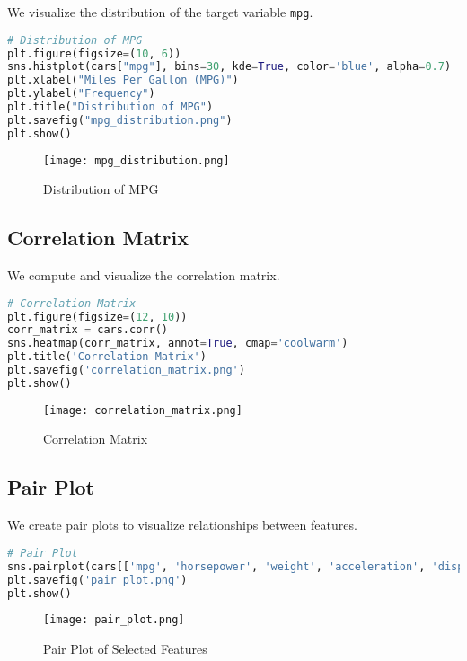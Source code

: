 \documentclass{article}
\begin{document}
We visualize the distribution of the target variable \texttt{mpg}.

\begin{lstlisting}[language=Python]
# Distribution of MPG
plt.figure(figsize=(10, 6))
sns.histplot(cars["mpg"], bins=30, kde=True, color='blue', alpha=0.7)
plt.xlabel("Miles Per Gallon (MPG)")
plt.ylabel("Frequency")
plt.title("Distribution of MPG")
plt.savefig("mpg_distribution.png")
plt.show()
\end{lstlisting}

\begin{figure}[H]
    \centering
    \texttt{[image: mpg\_distribution.png]}
    \caption{Distribution of MPG}
\end{figure}

\subsection{Correlation Matrix}

We compute and visualize the correlation matrix.

\begin{lstlisting}[language=Python]
# Correlation Matrix
plt.figure(figsize=(12, 10))
corr_matrix = cars.corr()
sns.heatmap(corr_matrix, annot=True, cmap='coolwarm')
plt.title('Correlation Matrix')
plt.savefig('correlation_matrix.png')
plt.show()
\end{lstlisting}

\begin{figure}[H]
    \centering
    \texttt{[image: correlation\_matrix.png]}
    \caption{Correlation Matrix}
\end{figure}

\subsection{Pair Plot}

We create pair plots to visualize relationships between features.

\begin{lstlisting}[language=Python]
# Pair Plot
sns.pairplot(cars[['mpg', 'horsepower', 'weight', 'acceleration', 'displacement']])
plt.savefig('pair_plot.png')
plt.show()
\end{lstlisting}

\begin{figure}[H]
    \centering
    \texttt{[image: pair\_plot.png]}
    \caption{Pair Plot of Selected Features}
\end{figure}
\end{document}
